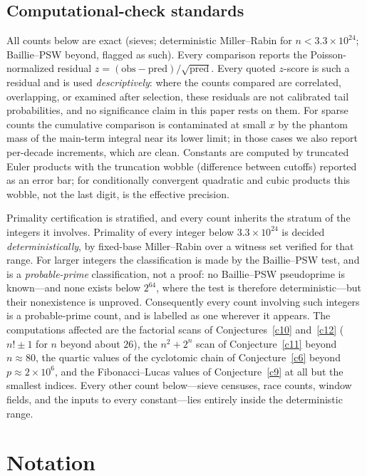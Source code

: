 \documentclass[11pt]{article}
\theoremstyle{definition}
\begin{document}
\subsection*{Computational-check standards}

All counts below are exact (sieves; deterministic Miller--Rabin for
$n<3.3\times10^{24}$; Baillie--PSW beyond, flagged as such).  Every
comparison reports the Poisson-normalized residual
$z=(\mathrm{obs}-\mathrm{pred})/\sqrt{\mathrm{pred}}$.  Every quoted
$z$-score is such a residual and is used \emph{descriptively}: where
the counts compared are correlated, overlapping, or examined after
selection, these residuals are not calibrated tail probabilities, and
no significance claim in this paper rests on them.  For sparse
counts the cumulative comparison is contaminated at small $x$ by the
phantom mass of the main-term integral near its lower limit; in those
cases we also report per-decade increments, which are clean.  Constants
are computed by truncated Euler products with the truncation wobble
(difference between cutoffs) reported as an error bar; for conditionally
convergent quadratic and cubic products this wobble, not the last digit,
is the effective precision.

Primality certification is stratified, and every count inherits the
stratum of the integers it involves.  Primality of every integer below
$3.3\times10^{24}$ is decided \emph{deterministically}, by fixed-base
Miller--Rabin over a witness set verified for that range.  For larger
integers the classification is made by the Baillie--PSW test, and is a
\emph{probable-prime} classification, not a proof: no Baillie--PSW
pseudoprime is known---and none exists below $2^{64}$, where the test
is therefore deterministic---but their nonexistence is unproved.
Consequently every count involving such integers is a probable-prime
count, and is labelled as one wherever it appears.  The computations
affected are the factorial scans of Conjectures~\ref{c10}
and~\ref{c12} ($n!\pm1$ for $n$ beyond about $26$), the $n^2+2^n$ scan
of Conjecture~\ref{c11} beyond $n\approx80$, the quartic values of the
cyclotomic chain of Conjecture~\ref{c6} beyond $p\approx2\times10^6$,
and the Fibonacci--Lucas values of Conjecture~\ref{c9} at all but the
smallest indices.  Every other count below---sieve censuses, race
counts, window fields, and the inputs to every constant---lies
entirely inside the deterministic range.

\section{Notation}
\end{document}
